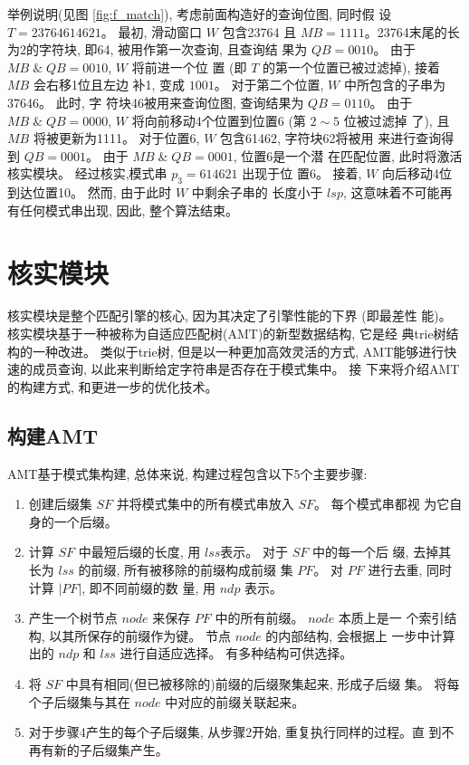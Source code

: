 举例说明(见图 \ref{fig:f_match}), 考虑前面构造好的查询位图, 同时假
设 $T=23764614621$。  最初, 滑动窗口 $W$ 包含23764 且
$MB = 1111$。23764末尾的长为2的字符块, 即64, 被用作第一次查询, 且查询结
果为 $QB=0010$。 由于 $MB\; \&\; QB = 0010$, $W$ 将前进一个位
置 (即 $T$ 的第一个位置已被过滤掉), 接着 $MB$ 会右移1位且左边
补1, 变成 $1001$。 对于第二个位置, $W$ 中所包含的子串为37646。 此时, 字
符块46被用来查询位图, 查询结果为 $QB=0110$。 由于 $MB\; \& \;
QB=0000$, $W$ 将向前移动4个位置到位置6 (第 $2 \sim 5$ 位被过滤掉
了), 且 $MB$ 将被更新为1111。 对于位置6, $W$ 包含61462, 字符块62将被用
来进行查询得到 $QB = 0001$。 由于 $MB\; \& \; QB = 0001$, 位置6是一个潜
在匹配位置, 此时将激活核实模块。 经过核实,模式串 $p_3=614621$ 出现于位
置6。 接着, $W$ 向后移动4位到达位置10。 然而, 由于此时 $W$ 中剩余子串的
长度小于 $lsp$, 这意味着不可能再有任何模式串出现, 因此, 整个算法结束。

\section{核实模块}
\label{sec:verification}

核实模块是整个匹配引擎的核心, 因为其决定了引擎性能的下界 (即最差性
能)。 核实模块基于一种被称为自适应匹配树(AMT)的新型数据结构, 它是经
典trie树结构的一种改进。 类似于trie树, 但是以一种更加高效灵活的方式,
AMT能够进行快速的成员查询, 以此来判断给定字符串是否存在于模式集中。 接
下来将介绍AMT的构建方式, 和更进一步的优化技术。

\subsection{构建AMT}
\label{subsec:amt}

AMT基于模式集构建, 总体来说, 构建过程包含以下5个主要步骤:

\begin{enumerate}
\item 创建后缀集 $SF$ 并将模式集中的所有模式串放入 $SF$。 每个模式串都视
  为它自身的一个后缀。
\item 计算 $SF$ 中最短后缀的长度, 用 $lss$表示。 对于 $SF$ 中的每一个后
  缀, 去掉其长为 $lss$ 的前缀, 所有被移除的前缀构成前缀
  集 $PF$。 对 $PF$ 进行去重, 同时计算 $|PF|$, 即不同前缀的数
  量, 用 $ndp$ 表示。
\item 产生一个树节点 $node$ 来保存 $PF$ 中的所有前缀。 $node$ 本质上是一
  个索引结构, 以其所保存的前缀作为键。 节点 $node$ 的内部结构, 会根据上
  一步中计算出的 $ndp$ 和 $lss$ 进行自适应选择。 有多种结构可供选择。
\item 将 $SF$ 中具有相同(但已被移除的)前缀的后缀聚集起来, 形成子后缀
  集。 将每个子后缀集与其在 $node$ 中对应的前缀关联起来。
\item 对于步骤4产生的每个子后缀集, 从步骤2开始, 重复执行同样的过程。直
  到不再有新的子后缀集产生。
\end{enumerate}

